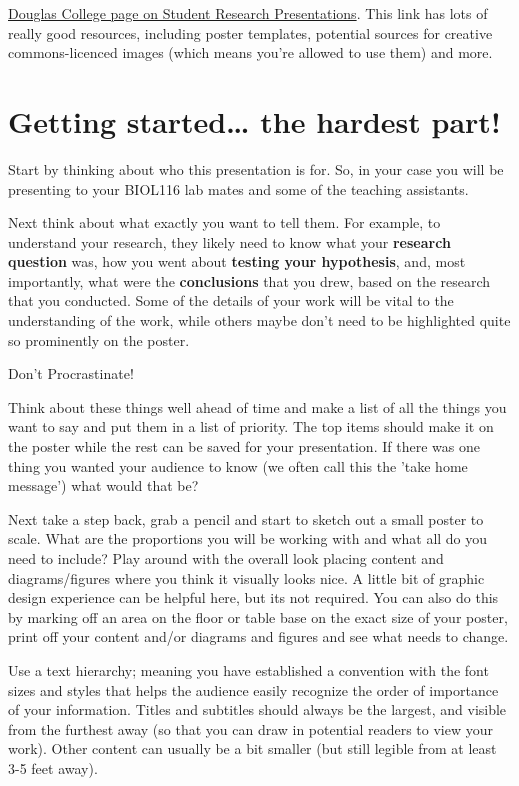 \documentclass[
]{book}
\begin{document}
\href{https://guides.douglascollege.ca/ResearchPoster}{Douglas College page on Student Research Presentations}. This link has lots of really good resources, including poster templates, potential sources for creative commons-licenced images (which means you're allowed to use them) and more.

\hypertarget{getting-started-the-hardest-part}{%
\section*{Getting started\ldots{} the hardest part!}\label{getting-started-the-hardest-part}}

Start by thinking about who this presentation is for. So, in your case you will be presenting to your BIOL116 lab mates and some of the teaching assistants.

Next think about what exactly you want to tell them. For example, to understand your research, they likely need to know what your \textbf{research question} was, how you went about \textbf{testing your hypothesis}, and, most importantly, what were the \textbf{conclusions} that you drew, based on the research that you conducted. Some of the details of your work will be vital to the understanding of the work, while others maybe don't need to be highlighted quite so prominently on the poster.

Don't Procrastinate!

Think about these things well ahead of time and make a list of all the things you want to say and put them in a list of priority. The top items should make it on the poster while the rest can be saved for your presentation. If there was one thing you wanted your audience to know (we often call this the 'take home message') what would that be?

Next take a step back, grab a pencil and start to sketch out a small poster to scale. What are the proportions you will be working with and what all do you need to include? Play around with the overall look placing content and diagrams/figures where you think it visually looks nice. A little bit of graphic design experience can be helpful here, but its not required. You can also do this by marking off an area on the floor or table base on the exact size of your poster, print off your content and/or diagrams and figures and see what needs to change.

Use a text hierarchy; meaning you have established a convention with the font sizes and styles that helps the audience easily recognize the order of importance of your information. Titles and subtitles should always be the largest, and visible from the furthest away (so that you can draw in potential readers to view your work). Other content can usually be a bit smaller (but still legible from at least 3-5 feet away).
\end{document}

